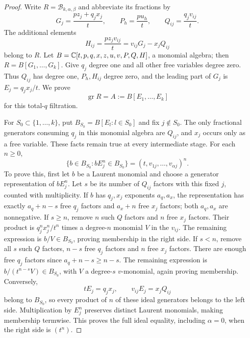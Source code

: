 \begin{proof}
Write $R=\mathcal B_{k,\alpha,\beta}$ and abbreviate its fractions by
\[
 G_j=\frac{pz_j+q_jx_j}t,\qquad P_h=\frac{pu_h}t,
 \qquad Q_{ij}=\frac{q_jv_{ij}}t.
\]
The additional elements
\begin{equation}\label{nb:H}
 H_{ij}=\frac{pz_jv_{ij}}t=v_{ij}G_j-x_jQ_{ij}
\end{equation}
belong to $R$. Let
$B=\mathbb C[t,p,q,x,z,u,v,P,Q,H]$, a monomial algebra; then
$R=B[G_1,\ldots,G_k]$. Give $q_j$ degree one and all other free
variables degree zero. Thus $Q_{ij}$ has degree one, $P_h,H_{ij}$
degree zero, and the leading part of $G_j$ is
$E_j=q_jx_j/t$. We prove
\begin{equation}\label{nb:star-graded}
 \operatorname{gr}R=A:=B[E_1,\ldots,E_k]
\end{equation}
for this total-$q$ filtration.

For $S_0\subset\{1,\ldots,k\}$, put
$B_{S_0}=B[E_l:l\in S_0]$ and fix $j\notin S_0$. The only
fractional generators consuming $q_j$ in this monomial algebra are
$Q_{ij}$, and $x_j$ occurs only as a free variable. These facts
remain true at every intermediate stage. For each $n\geq0$,
\begin{equation}\label{nb:denominator-ideals}
 \{b\in B_{S_0}:bE_j^n\in B_{S_0}\}
       =(t,v_{1j},\ldots,v_{\alpha j})^n.
\end{equation}
To prove this, first let $b$ be a Laurent monomial and choose a
generator representation of $bE_j^n$. Let $s$ be its number of
$Q_{ij}$ factors with this fixed $j$, counted with multiplicity.
If $b$ has $q_j,x_j$ exponents $a_q,a_x$, the representation has
exactly $a_q+n-s$ free $q_j$ factors and $a_x+n$ free $x_j$ factors;
both $a_q,a_x$ are nonnegative. If $s\geq n$, remove $n$ such
$Q$ factors and $n$ free $x_j$ factors. Their product is
$q_j^nx_j^n/t^n$ times a degree-$n$ monomial $V$ in the $v_{ij}$.
The remaining expression is $b/V\in B_{S_0}$, proving membership
in the right side. If $s<n$, remove all $s$ such $Q$ factors,
$n-s$ free $q_j$ factors and $n$ free $x_j$ factors. There are
enough free $q_j$ factors since $a_q+n-s\geq n-s$. The remaining
expression is $b/(t^{n-s}V)\in B_{S_0}$, with $V$ a degree-$s$
$v$-monomial, again proving membership. Conversely,
\[
 tE_j=q_jx_j,\qquad v_{ij}E_j=x_jQ_{ij}
\]
belong to $B_{S_0}$, so every product of $n$ of these ideal
generators belongs to the left side. Multiplication by $E_j^n$
preserves distinct Laurent monomials, making membership termwise.
This proves the full ideal equality, including $\alpha=0$, when
the right side is $(t^n)$.


\end{proof}
